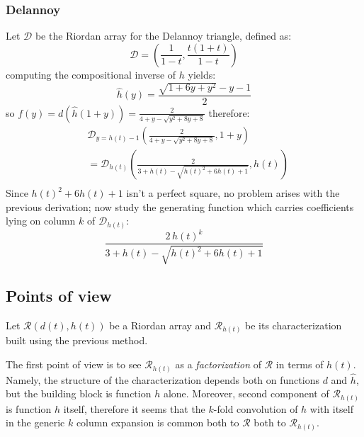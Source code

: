 \subsubsection{Delannoy}

Let $\mathcal{D}$ be the Riordan array for the Delannoy triangle, defined as:
\begin{displaymath} 
    \mathcal{D} =\left( \frac{1}{1-t}, \frac{t(1+t)}{1-t}  \right)
\end{displaymath} 
computing the compositional inverse of $h$ yields:
\begin{displaymath} 
    \hat{h}(y) = \frac{\sqrt{1+6y+y^2}-y-1}{2}
\end{displaymath} 
so $f(y)=d(\hat{h}(1+y))=\frac{2}{4 + y - \sqrt{y^2 + 8y + 8} }$ therefore:
\begin{displaymath} 
    \begin{split}
        & \mathcal{D}_{y=h(t)-1}\left( \frac{2}{4+y-\sqrt{y^2+8y+8}}, 1+y \right)\\
        &= \mathcal{D}_{h(t)}\left( \frac{2}{3+h(t)-\sqrt{h(t)^2+6h(t)+1}}, h(t) \right) \\
    \end{split}
\end{displaymath} 
Since $h(t)^2+6h(t)+1$ isn't a perfect square, no problem arises with the previous
derivation; now study the generating function which carries coefficients lying on column $k$
of $\mathcal{D}_{h(t)}$:
\begin{displaymath} 
    \frac{2\,h(t)^k}{3+h(t)-\sqrt{h(t)^2+6h(t)+1}}
\end{displaymath} 

\subsection{Points of view}

Let $\mathcal{R}\left(d(t),h(t)\right)$ be a Riordan array and $\mathcal{R}_{h(t)}$ be
its characterization built using the previous method.

The first point of view is to see $\mathcal{R}_{h(t)}$ as a \emph{factorization}
of $\mathcal{R}$ in terms of $h(t)$. Namely, the structure of the characterization
depends both on functions $d$ and $\hat{h}$, but the building block is function $h$
alone. Moreover, second component of $\mathcal{R}_{h(t)}$ is function $h$ itself,
therefore it seems that the $k$-fold convolution of $h$ with itself in the generic
$k$ column expansion is common both to $\mathcal{R}$ both to $\mathcal{R}_{h(t)}$.

